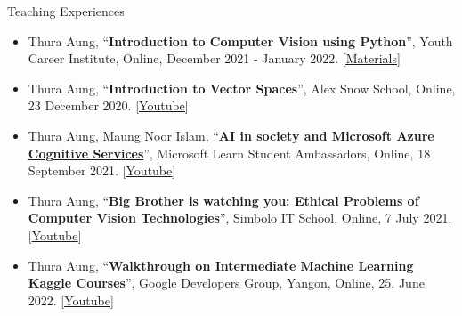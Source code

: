 \documentclass{resume} %
\begin{document}
\begin{rSection}{Teaching Experiences}

 \begin{itemize}
 \item Thura Aung, “\textbf{Introduction to Computer Vision using Python}”, Youth Career Institute, Online, December 2021 - January 2022. \href{https://github.com/ThuraAung1601/Computer-Vision-Adventures}{[\underline{Materials}]}
\end{itemize}
   \begin{itemize}
 \item Thura Aung, “\textbf{Introduction to Vector Spaces}”, Alex Snow School, Online, 23 December 2020.  [\href{https://youtu.be/BKidT_2ZW88}{\underline{Youtube}}]
 \item Thura Aung, Maung Noor Islam, “\href{}{\textbf{AI in society and Microsoft Azure Cognitive Services}}”, Microsoft Learn Student Ambassadors, Online, 18 September 2021. [\href{https://youtu.be/ZITONCjeKD8}{\underline{Youtube}}]
 \item Thura Aung, “\textbf{Big Brother is watching you: Ethical Problems of Computer Vision Technologies}”, Simbolo IT School, Online, 7 July 2021. [\href{https://youtu.be/MaEO-AArXwc}{\underline{Youtube}}]
 \item Thura Aung, “\textbf{Walkthrough on Intermediate Machine Learning Kaggle Courses}”, Google Developers Group, Yangon, Online, 25, June 2022. [\href{https://www.youtube.com/watch?v=YjO2ASwOlTU&list=PLGkRDeUNLu6ZO2i44iaaW7HRo3bu5Tsln&index=4&t=3s}{\underline{Youtube}}]
\end{itemize}

\end{rSection}


\end{document}
